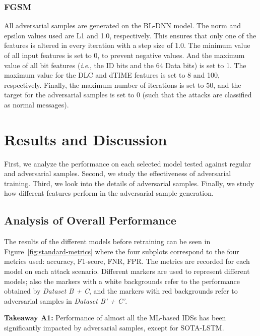 \documentclass[conference]{IEEEtran}
\newcommand{\ie}{\textit{i}.\textit{e}., }
\begin{document}
\subsubsection{FGSM}
%
All adversarial samples are generated on the BL-DNN model. The norm and epsilon values used are L1 and 1.0, respectively. This ensures that only one of the features is altered in every iteration with a step size of 1.0. The minimum value of all input features is set to 0, to prevent negative values. And the maximum value of all bit features (\ie the ID bits and the 64 Data bits) is set to 1. The maximum value for the DLC and dTIME features is set to 8 and 100, respectively. Finally, the maximum number of iterations is set to 50, and the target for the adversarial samples is set to 0 (such that the attacks are classified as normal messages).


\section{Results and Discussion}
\label{sec:result}
%
First, we analyze the performance on each selected model tested against regular and adversarial samples. Second, we study the effectiveness of adversarial training. Third, we look into the details of adversarial samples. Finally, we study how different features perform in the adversarial sample generation.






\subsection{Analysis of Overall Performance}


The results of the different models before retraining can be seen in Figure~\ref{fig:standard-metrics} where the four subplots correspond to the four metrics used: accuracy, F1-score, FNR, FPR. The metrics are recorded for each model on each attack scenario. Different markers are used to represent different models; also the markers with a white backgrounds refer to the performance obtained by \textit{Dataset B + C}, and the markers with red backgrounds refer to adversarial samples in \textit{Dataset B' + C'}. %

\begin{tcolorbox}[float=t,
                  colback=gray!30,%
                  colframe=black,%
                  width=\columnwidth,%
                  boxrule=0.5pt,
                  arc=1mm, auto outer arc,
                 ]
\noindent\textbf{Takeaway A1:} Performance of almost all the ML-based IDSs has been significantly impacted by adversarial samples, except for SOTA-LSTM.

\end{tcolorbox}
\end{document}
